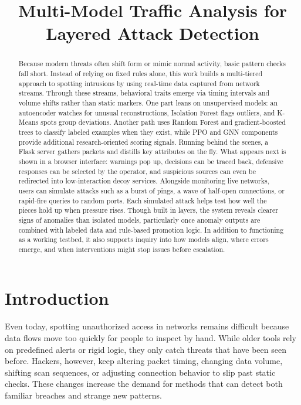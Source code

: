 \documentclass[conference]{IEEEtran}
\title{Multi-Model Traffic Analysis for Layered Attack Detection}
\author{
    \IEEEauthorblockN{Josh Swanson, Jerry Buno, Connor Benitez}
    \IEEEauthorblockA{CSCI 480}
}
\begin{document}
\maketitle

\begin{abstract}
Because modern threats often shift form or mimic normal activity, basic pattern checks fall short. Instead of relying on fixed rules alone, this work builds a multi-tiered approach to spotting intrusions by using real-time data captured from network streams. Through these streams, behavioral traits emerge via timing intervals and volume shifts rather than static markers. One part leans on unsupervised models: an autoencoder watches for unusual reconstructions, Isolation Forest flags outliers, and K-Means spots group deviations. Another path uses Random Forest and gradient-boosted trees to classify labeled examples when they exist, while PPO and GNN components provide additional research-oriented scoring signals. Running behind the scenes, a Flask server gathers packets and distills key attributes on the fly. What appears next is shown in a browser interface: warnings pop up, decisions can be traced back, defensive responses can be selected by the operator, and suspicious sources can even be redirected into low-interaction decoy services. Alongside monitoring live networks, users can simulate attacks such as a burst of pings, a wave of half-open connections, or rapid-fire queries to random ports. Each simulated attack helps test how well the pieces hold up when pressure rises. Though built in layers, the system reveals clearer signs of anomalies than isolated models, particularly once anomaly outputs are combined with labeled data and rule-based promotion logic. In addition to functioning as a working testbed, it also supports inquiry into how models align, where errors emerge, and when interventions might stop issues before escalation.
\end{abstract}

\section{Introduction}

Even today, spotting unauthorized access in networks remains difficult because data flows move too quickly for people to inspect by hand. While older tools rely on predefined alerts or rigid logic, they only catch threats that have been seen before. Hackers, however, keep altering packet timing, changing data volume, shifting scan sequences, or adjusting connection behavior to slip past static checks. These changes increase the demand for methods that can detect both familiar breaches and strange new patterns.
\end{document}
